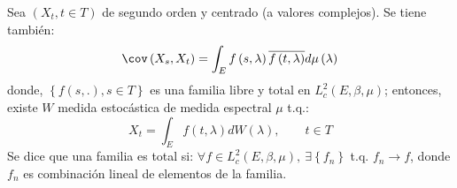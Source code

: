 \begin{teorema}
Sea $(X_{t}, t\in T)$ de segundo orden y centrado (a valores complejos). Se tiene tambi\'{e}n:
\[
\cov\left( X_{s},X_{t} \right)=\int_E {f\left( s,\lambda \right)\overline{f\left( t, \lambda \right)}d\mu \left( \lambda \right)} 
\]
donde, $\left\{ f\left( s,. \right),s\in T \right\}$ es una familia libre y total en $L_{c}^{2}\left( E,\beta ,\mu \right)$; entonces, existe $W$ medida estoc\'{a}stica de medida espectral $\mu $ t.q.:
\[
X_{t}=\int_E {f\left( t,\lambda \right)dW\left( \lambda \right)},\qquad t\in T
\]
Se dice que una familia es total si: $\forall f\in L_{c}^{2}\left( E,\beta ,\mu \right),\ \exists \left\{ f_{n} \right\}$ t.q. $f_{n}\to f$, donde $f_{n}$ es combinaci\'{o}n lineal de elementos de la familia.
\end{teorema}


